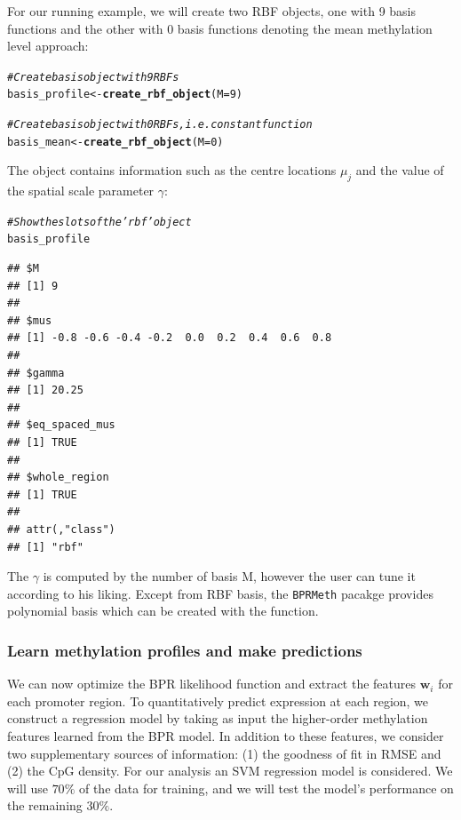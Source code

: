\documentclass{article}\usepackage[]{graphicx}\usepackage[usenames,dvipsnames]{color}
\makeatletter
\newcommand{\hlnum}[1]{\textcolor[rgb]{0.686,0.059,0.569}{#1}}%
\newcommand{\hlcom}[1]{\textcolor[rgb]{0.678,0.584,0.686}{\textit{#1}}}%
\newcommand{\hlstd}[1]{\textcolor[rgb]{0.345,0.345,0.345}{#1}}%
\newcommand{\hlkwb}[1]{\textcolor[rgb]{0.69,0.353,0.396}{#1}}%
\newcommand{\hlkwc}[1]{\textcolor[rgb]{0.333,0.667,0.333}{#1}}%
\newcommand{\hlkwd}[1]{\textcolor[rgb]{0.737,0.353,0.396}{\textbf{#1}}}%
\newenvironment{kframe}{%
 \def\at@end@of@kframe{}%
 \ifinner\ifhmode%
  \def\at@end@of@kframe{\end{minipage}}%
  \begin{minipage}{\columnwidth}%
 \fi\fi%
 \def\FrameCommand##1{\hskip\@totalleftmargin \hskip-\fboxsep
 \colorbox{shadecolor}{##1}\hskip-\fboxsep
     \hskip-\linewidth \hskip-\@totalleftmargin \hskip\columnwidth}%
 \MakeFramed {\advance\hsize-\width
   \@totalleftmargin\z@ \linewidth\hsize
   \@setminipage}}%
 {\par\unskip\endMakeFramed%
 \at@end@of@kframe}
\newenvironment{knitrout}{}{} %
\makeatother
\begin{document}
For our running example, we will create two RBF objects, one with 9 basis functions and the other with 0 basis functions denoting the mean methylation level approach:
\begin{knitrout}
\color{fgcolor}\begin{kframe}
\begin{alltt}
\hlcom{# Create basis object with 9 RBFs}
\hlstd{basis_profile} \hlkwb{<-} \hlkwd{create_rbf_object}\hlstd{(}\hlkwc{M} \hlstd{=} \hlnum{9}\hlstd{)}

\hlcom{# Create basis object with 0 RBFs, i.e. constant function}
\hlstd{basis_mean} \hlkwb{<-} \hlkwd{create_rbf_object}\hlstd{(}\hlkwc{M} \hlstd{=} \hlnum{0}\hlstd{)}
\end{alltt}
\end{kframe}
\end{knitrout}

The  object contains information such as the centre locations $\mu_{j}$ and the value of the spatial scale parameter $\gamma$:
\begin{knitrout}
\color{fgcolor}\begin{kframe}
\begin{alltt}
\hlcom{# Show the slots of the 'rbf' object}
\hlstd{basis_profile}
\end{alltt}
\begin{verbatim}
## $M
## [1] 9
## 
## $mus
## [1] -0.8 -0.6 -0.4 -0.2  0.0  0.2  0.4  0.6  0.8
## 
## $gamma
## [1] 20.25
## 
## $eq_spaced_mus
## [1] TRUE
## 
## $whole_region
## [1] TRUE
## 
## attr(,"class")
## [1] "rbf"
\end{verbatim}
\end{kframe}
\end{knitrout}
The $\gamma$ is computed by the number of basis M, however the user can tune it according to his liking. Except from RBF basis, the \verb|BPRMeth| pacakge provides polynomial basis which can be created with the  function.

\subsubsection{Learn methylation profiles and make predictions}
We can now optimize the BPR likelihood function and extract the features $\mathbf{w}_{i}$ for each promoter region. To quantitatively predict expression at each region, we construct a regression model by taking as input the higher-order methylation features learned from the BPR model. In addition to these features, we consider two supplementary sources of information: (1) the goodness of fit in RMSE and (2) the CpG density. For our analysis an SVM regression model is considered. We will use $70\%$ of the data for training, and we will test the model's performance on the remaining $30\%$.
\end{document}
